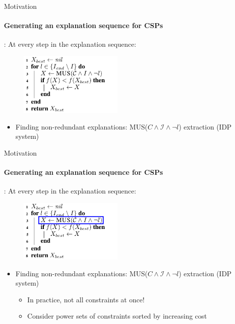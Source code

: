 \documentclass[handout]{beamer}
\newcommand\m[1]{\ensuremath{#1}\xspace}
\newcommand\formulac{\ensuremath{\m{C} }\xspace}
\begin{document}
	\begin{frame}{Motivation}
		\framesubtitle{Generating an explanation sequence for CSPs}
\cite{bogaerts2020step}: At every step in the explanation sequence:
		\begin{figure}
			\includegraphics[width=0.45\textwidth]{algo_mus2.png}
		\end{figure}
		\begin{itemize}
			\item Finding non-redundant explanations: MUS($\formulac \land \mathcal{I} \land \neg l$) extraction (IDP system)
			
		\end{itemize}
	\end{frame}

	\begin{frame}{Motivation}
	\framesubtitle{Generating an explanation sequence for CSPs}
\cite{bogaerts2020step}: At every step in the explanation sequence:
	\begin{figure}
		\includegraphics[width=0.45\textwidth]{algo_mus2_b.png}
	\end{figure}
	\begin{itemize}
		\item Finding non-redundant explanations: MUS($\formulac \land \mathcal{I} \land \neg l $) extraction (IDP system)
		
		\begin{itemize}
			\item In practice, not all constraints at once!
			\item Consider power sets of constraints sorted by increasing cost
		\end{itemize}
	\end{itemize}
\end{frame}
\end{document}

